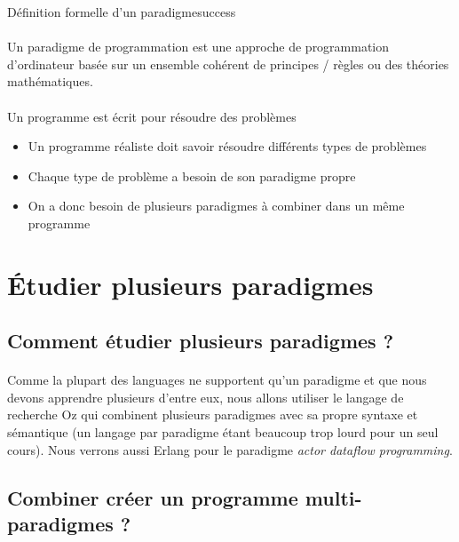   \tboxspace

  \begin{titletbox}{Définition formelle d'un paradigme}{success}
    \paragraph{}Un paradigme de programmation est une approche de programmation d'ordinateur basée sur un ensemble 
    cohérent de principes / règles ou des théories mathématiques.
    \tcblower
    \paragraph{} Un programme est écrit pour résoudre des problèmes
    \begin{itemize}[label=\textbullet, font=\small]
      \item Un programme réaliste doit savoir résoudre différents types de problèmes
      \item Chaque type de problème a besoin de son paradigme propre
      \item On a donc besoin de plusieurs paradigmes à combiner dans un même programme
    \end{itemize}
  \end{titletbox}


  \section{Étudier plusieurs paradigmes}

    \subsection{Comment étudier plusieurs paradigmes ?}

      \paragraph{}Comme la plupart des languages ne supportent qu'un paradigme et que nous devons apprendre plusieurs 
      d'entre eux, nous allons utiliser le langage de recherche Oz qui combinent plusieurs paradigmes avec sa propre 
      syntaxe et sémantique (un langage par paradigme étant beaucoup trop lourd pour un seul cours).
      Nous verrons aussi Erlang pour le paradigme \textit{actor dataflow programming}.

    \subsection{Combiner créer un programme multi-paradigmes ?}

